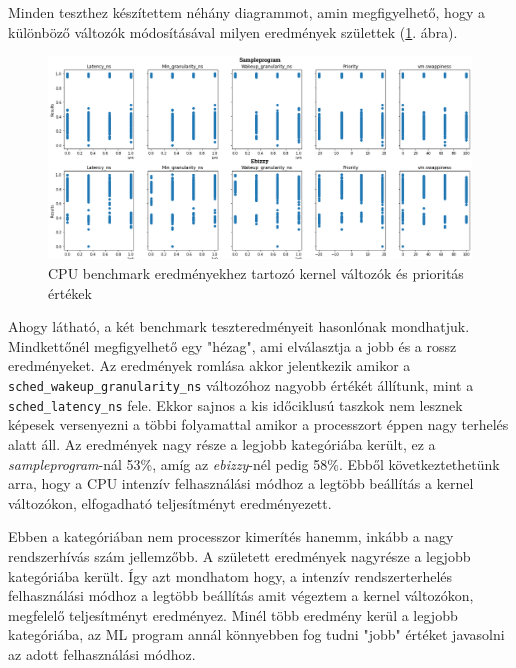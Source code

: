 Minden teszthez készítettem néhány diagrammot, amin megfigyelhető, hogy a különböző változók módosításával milyen eredmények születtek (\ref{fig:CpuParameters}. ábra).

\begin{figure}[h!]
\centering
\includegraphics[width=\textwidth]{images/cpuBenchmarkValues.png}
\caption{CPU benchmark eredményekhez tartozó kernel változók és prioritás értékek}
\label{fig:CpuParameters}
\end{figure}

Ahogy látható, a két benchmark teszteredményeit hasonlónak mondhatjuk. Mindkettőnél megfigyelhető egy "hézag", ami elválasztja a jobb és a rossz eredményeket. Az eredmények romlása akkor jelentkezik amikor a \texttt{sched\_wakeup\_granularity\_ns} változóhoz nagyobb értékét állítunk, mint a \texttt{sched\_latency\_ns} fele. Ekkor sajnos a kis időciklusú taszkok nem lesznek képesek versenyezni a többi folyamattal amikor a processzort éppen nagy terhelés alatt áll.
Az eredmények nagy része a legjobb kategóriába került, ez a \textit{sampleprogram}-nál 53\%, amíg az \textit{ebizzy}-nél pedig 58\%. Ebből következtethetünk arra, hogy a CPU intenzív felhasználási módhoz a legtöbb beállítás a kernel változókon, elfogadható teljesítményt eredményezett.


Ebben a kategóriában nem processzor kimerítés hanemm, inkább a nagy rendszerhívás szám jellemzőbb.
A született eredmények nagyrésze a legjobb kategóriába került. Így azt mondhatom hogy, a intenzív rendszerterhelés felhasználási módhoz a legtöbb beállítás amit végeztem a kernel változókon, megfelelő teljesítményt eredményez. Minél több eredmény kerül a legjobb kategóriába, az ML program annál könnyebben fog tudni "jobb" értéket javasolni az adott felhasználási módhoz.


